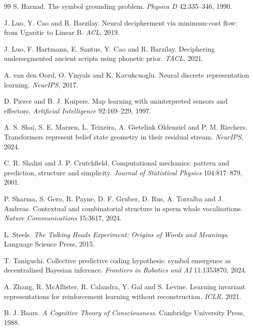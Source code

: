 \begin{thebibliography}{99}
 S. Harnad. The symbol grounding problem. \emph{Physica D}
42:335--346, 1990.

 J. Luo, Y. Cao and R. Barzilay. Neural decipherment via minimum-cost
flow: from Ugaritic to Linear B. \emph{ACL}, 2019.

 J. Luo, F. Hartmann, E. Santus, Y. Cao and R. Barzilay. Deciphering
undersegmented ancient scripts using phonetic prior. \emph{TACL}, 2021.

 A. van den Oord, O. Vinyals and K. Kavukcuoglu. Neural discrete
representation learning. \emph{NeurIPS}, 2017.

 D. Pierce and B. J. Kuipers. Map learning with uninterpreted sensors
and effectors. \emph{Artificial Intelligence} 92:169--229, 1997.

 A. S. Shai, S. E. Marzen, L. Teixeira, A. Gietelink Oldenziel and
P. M. Riechers. Transformers represent belief state geometry in their residual stream.
\emph{NeurIPS}, 2024.

 C. R. Shalizi and J. P. Crutchfield. Computational mechanics:
pattern and prediction, structure and simplicity. \emph{Journal of Statistical Physics}
104:817--879, 2001.

 P. Sharma, S. Gero, R. Payne, D. F. Gruber, D. Rus, A. Torralba and
J. Andreas. Contextual and combinatorial structure in sperm whale vocalisations.
\emph{Nature Communications} 15:3617, 2024.

 L. Steels. \emph{The Talking Heads Experiment: Origins of Words and
Meanings}. Language Science Press, 2015.

 T. Taniguchi. Collective predictive coding hypothesis: symbol
emergence as decentralized Bayesian inference. \emph{Frontiers in Robotics and AI}
11:1353870, 2024.

 A. Zhang, R. McAllister, R. Calandra, Y. Gal and S. Levine. Learning
invariant representations for reinforcement learning without reconstruction. \emph{ICLR},
2021.


 B. J. Baars. \emph{A Cognitive Theory of Consciousness}. Cambridge
University Press, 1988.


\end{thebibliography}
